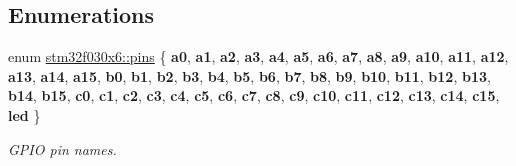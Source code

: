 \subsection*{Enumerations}
\begin{DoxyCompactItemize}
\item 
\mbox{\label{namespacestm32f030x6_aec819db41bff19f45418c0d22e5ccecf}} 
enum \hyperlink{namespacestm32f030x6_aec819db41bff19f45418c0d22e5ccecf}{stm32f030x6\+::pins} \{ \newline
{\bfseries a0}, 
{\bfseries a1}, 
{\bfseries a2}, 
{\bfseries a3}, 
\newline
{\bfseries a4}, 
{\bfseries a5}, 
{\bfseries a6}, 
{\bfseries a7}, 
\newline
{\bfseries a8}, 
{\bfseries a9}, 
{\bfseries a10}, 
{\bfseries a11}, 
\newline
{\bfseries a12}, 
{\bfseries a13}, 
{\bfseries a14}, 
{\bfseries a15}, 
\newline
{\bfseries b0}, 
{\bfseries b1}, 
{\bfseries b2}, 
{\bfseries b3}, 
\newline
{\bfseries b4}, 
{\bfseries b5}, 
{\bfseries b6}, 
{\bfseries b7}, 
\newline
{\bfseries b8}, 
{\bfseries b9}, 
{\bfseries b10}, 
{\bfseries b11}, 
\newline
{\bfseries b12}, 
{\bfseries b13}, 
{\bfseries b14}, 
{\bfseries b15}, 
\newline
{\bfseries c0}, 
{\bfseries c1}, 
{\bfseries c2}, 
{\bfseries c3}, 
\newline
{\bfseries c4}, 
{\bfseries c5}, 
{\bfseries c6}, 
{\bfseries c7}, 
\newline
{\bfseries c8}, 
{\bfseries c9}, 
{\bfseries c10}, 
{\bfseries c11}, 
\newline
{\bfseries c12}, 
{\bfseries c13}, 
{\bfseries c14}, 
{\bfseries c15}, 
\newline
{\bfseries led}
 \}\begin{DoxyCompactList}\small\item\em G\+P\+IO pin names. \end{DoxyCompactList}
\end{DoxyCompactItemize}
